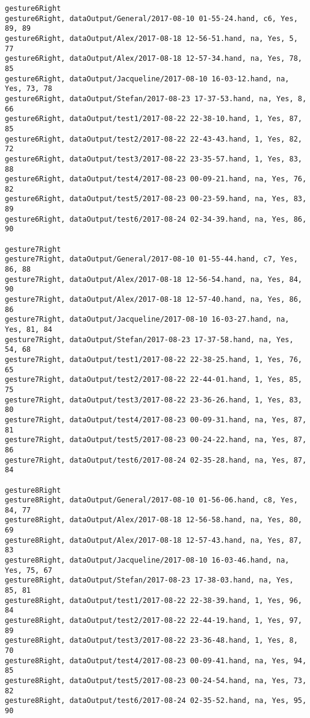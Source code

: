 \begin{verbatim}
gesture6Right
gesture6Right, dataOutput/General/2017-08-10 01-55-24.hand, c6, Yes, 89, 89
gesture6Right, dataOutput/Alex/2017-08-18 12-56-51.hand, na, Yes, 5, 77
gesture6Right, dataOutput/Alex/2017-08-18 12-57-34.hand, na, Yes, 78, 85
gesture6Right, dataOutput/Jacqueline/2017-08-10 16-03-12.hand, na, Yes, 73, 78
gesture6Right, dataOutput/Stefan/2017-08-23 17-37-53.hand, na, Yes, 8, 66
gesture6Right, dataOutput/test1/2017-08-22 22-38-10.hand, 1, Yes, 87, 85
gesture6Right, dataOutput/test2/2017-08-22 22-43-43.hand, 1, Yes, 82, 72
gesture6Right, dataOutput/test3/2017-08-22 23-35-57.hand, 1, Yes, 83, 88
gesture6Right, dataOutput/test4/2017-08-23 00-09-21.hand, na, Yes, 76, 82
gesture6Right, dataOutput/test5/2017-08-23 00-23-59.hand, na, Yes, 83, 89
gesture6Right, dataOutput/test6/2017-08-24 02-34-39.hand, na, Yes, 86, 90

gesture7Right
gesture7Right, dataOutput/General/2017-08-10 01-55-44.hand, c7, Yes, 86, 88
gesture7Right, dataOutput/Alex/2017-08-18 12-56-54.hand, na, Yes, 84, 90
gesture7Right, dataOutput/Alex/2017-08-18 12-57-40.hand, na, Yes, 86, 86
gesture7Right, dataOutput/Jacqueline/2017-08-10 16-03-27.hand, na, Yes, 81, 84
gesture7Right, dataOutput/Stefan/2017-08-23 17-37-58.hand, na, Yes, 54, 68
gesture7Right, dataOutput/test1/2017-08-22 22-38-25.hand, 1, Yes, 76, 65
gesture7Right, dataOutput/test2/2017-08-22 22-44-01.hand, 1, Yes, 85, 75
gesture7Right, dataOutput/test3/2017-08-22 23-36-26.hand, 1, Yes, 83, 80
gesture7Right, dataOutput/test4/2017-08-23 00-09-31.hand, na, Yes, 87, 81
gesture7Right, dataOutput/test5/2017-08-23 00-24-22.hand, na, Yes, 87, 86
gesture7Right, dataOutput/test6/2017-08-24 02-35-28.hand, na, Yes, 87, 84

gesture8Right
gesture8Right, dataOutput/General/2017-08-10 01-56-06.hand, c8, Yes, 84, 77
gesture8Right, dataOutput/Alex/2017-08-18 12-56-58.hand, na, Yes, 80, 69
gesture8Right, dataOutput/Alex/2017-08-18 12-57-43.hand, na, Yes, 87, 83
gesture8Right, dataOutput/Jacqueline/2017-08-10 16-03-46.hand, na, Yes, 75, 67
gesture8Right, dataOutput/Stefan/2017-08-23 17-38-03.hand, na, Yes, 85, 81
gesture8Right, dataOutput/test1/2017-08-22 22-38-39.hand, 1, Yes, 96, 84
gesture8Right, dataOutput/test2/2017-08-22 22-44-19.hand, 1, Yes, 97, 89
gesture8Right, dataOutput/test3/2017-08-22 23-36-48.hand, 1, Yes, 8, 70
gesture8Right, dataOutput/test4/2017-08-23 00-09-41.hand, na, Yes, 94, 85
gesture8Right, dataOutput/test5/2017-08-23 00-24-54.hand, na, Yes, 73, 82
gesture8Right, dataOutput/test6/2017-08-24 02-35-52.hand, na, Yes, 95, 90


\end{verbatim}
